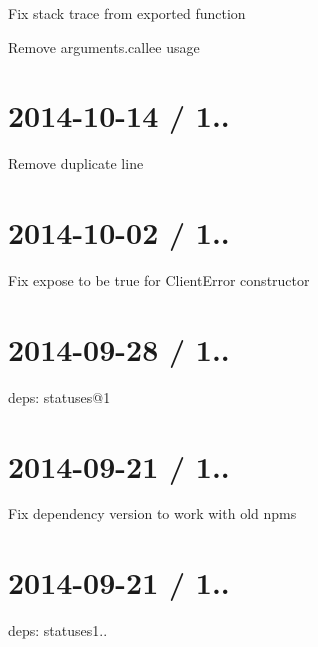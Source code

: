 \begin{DoxyItemize}
\item Fix stack trace from exported function
\item Remove {\ttfamily arguments.\+callee} usage
\end{DoxyItemize}

\section*{2014-\/10-\/14 / 1.. }


\begin{DoxyItemize}
\item Remove duplicate line
\end{DoxyItemize}

\section*{2014-\/10-\/02 / 1.. }


\begin{DoxyItemize}
\item Fix {\ttfamily expose} to be {\ttfamily true} for {\ttfamily Client\+Error} constructor
\end{DoxyItemize}

\section*{2014-\/09-\/28 / 1.. }


\begin{DoxyItemize}
\item deps\+: statuses@1
\end{DoxyItemize}

\section*{2014-\/09-\/21 / 1.. }


\begin{DoxyItemize}
\item Fix dependency version to work with old {\ttfamily npm}s
\end{DoxyItemize}

\section*{2014-\/09-\/21 / 1.. }


\begin{DoxyItemize}
\item deps\+: statuses1..
\end{DoxyItemize}

